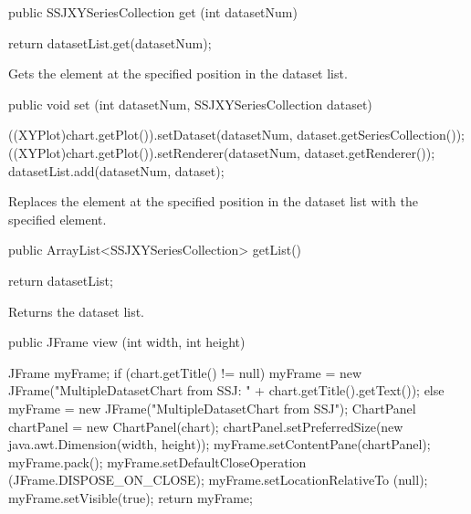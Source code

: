 \begin{htmlonly}
\end{htmlonly}
\begin{code}

   public SSJXYSeriesCollection get (int datasetNum) \begin{hide} {
      return datasetList.get(datasetNum);
   }\end{hide}
\end{code}
\begin{tabb}
   Gets the element at the specified position in the dataset list.
\end{tabb}
\begin{htmlonly}
\end{htmlonly}
\begin{code}

   public void set (int datasetNum, SSJXYSeriesCollection dataset) \begin{hide} {
      ((XYPlot)chart.getPlot()).setDataset(datasetNum, dataset.getSeriesCollection());
      ((XYPlot)chart.getPlot()).setRenderer(datasetNum, dataset.getRenderer());
      datasetList.add(datasetNum, dataset);
   }\end{hide}
\end{code}
\begin{tabb}
   Replaces the element at the specified position in the dataset list with the specified element.
\end{tabb}
\begin{htmlonly}
\end{htmlonly}
\begin{code}

   public ArrayList<SSJXYSeriesCollection> getList() \begin{hide} {
      return datasetList;
   }\end{hide}
\end{code}
\begin{tabb}
   Returns the dataset list.
\end{tabb}
\begin{htmlonly}
\end{htmlonly}
\begin{code}

   public JFrame view (int width, int height) \begin{hide} {
      JFrame myFrame;
      if (chart.getTitle() != null)
         myFrame = new JFrame("MultipleDatasetChart from SSJ: " +
                               chart.getTitle().getText());
      else
         myFrame = new JFrame("MultipleDatasetChart from SSJ");
      ChartPanel chartPanel = new ChartPanel(chart);
      chartPanel.setPreferredSize(new java.awt.Dimension(width, height));
      myFrame.setContentPane(chartPanel);
      myFrame.pack();
      myFrame.setDefaultCloseOperation (JFrame.DISPOSE_ON_CLOSE);
      myFrame.setLocationRelativeTo (null);
      myFrame.setVisible(true);
      return myFrame;
   }\end{hide}
\end{code}
